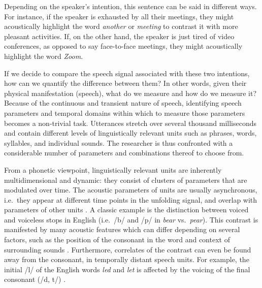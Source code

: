 \documentclass[Review,times,sageh]{sagej}
\begin{document}
\noindent Depending on the speaker's intention, this sentence can be said in different ways.
For instance, if the speaker is exhausted by all their meetings, they might acoustically highlight the word \emph{another} or \emph{meeting} to contrast it with more pleasant activities.
If, on the other hand, the speaker is just tired of video conferences, as opposed to say face-to-face meetings, they might acoustically highlight the word \emph{Zoom}.

If we decide to compare the speech signal associated with these two intentions, how can we quantify the difference between them?
In other words, given their physical manifestation (speech), what do we measure and how do we measure it?
Because of the continuous and transient nature of speech, identifying speech parameters and temporal domains within which to measure those parameters becomes a non-trivial task.
Utterances stretch over several thousand milliseconds and contain different levels of linguistically relevant units such as phrases, words, syllables, and individual sounds.
The researcher is thus confronted with a considerable number of parameters and combinations thereof to choose from.

From a phonetic viewpoint, linguistically relevant units are inherently multidimensional and dynamic: they consist of clusters of parameters that are modulated over time.
The acoustic parameters of units are usually asynchronous, i.e.~they appear at different time points in the unfolding signal, and overlap with parameters of other units \citep[e.g.][]{jongman2000acoustic, lisker1986voicing, summerfield1981articulatory, winter2014spoken}.
A classic example is the distinction between voiced and voiceless stops in English (i.e.~/b/ and /p/ in \emph{bear} vs.~\emph{pear}).
This contrast is manifested by many acoustic features which can differ depending on several factors, such as the position of the consonant in the word and context of surrounding sounds \citep{lisker1977rapid}.
Furthermore, correlates of the contrast can even be found away from the consonant, in temporally distant speech units.
For example, the initial /l/ of the English words \emph{led} and \emph{let} is affected by the voicing of the final consonant (/d, t/) \citep{hawkins2004influence}.
\end{document}
